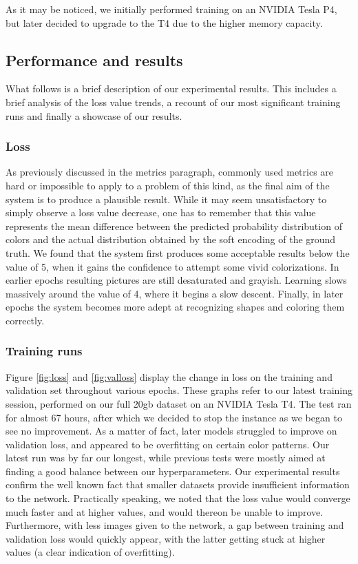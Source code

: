 \documentclass[twoside,twocolumn]{article}
\begin{document}
As it may be noticed, we initially performed training on an NVIDIA Tesla P4, but later decided to upgrade to the T4 due to the higher memory capacity.


\subsection{Performance and results}

What follows is a brief description of our experimental results. This includes a brief analysis of the loss value trends, a recount of our most significant training runs and finally a showcase of our results.

\subsubsection{Loss}

As previously discussed in the metrics paragraph, commonly used metrics are hard or impossible to apply to a problem of this kind, as the final aim of the system is to produce a plausible result. While it may seem unsatisfactory to simply observe a loss value decrease, one has to remember that this value represents the mean difference between the predicted probability distribution of colors and the actual distribution obtained by the soft encoding of the ground truth. 
We found that the system first produces some acceptable results below the value of 5, when it gains the confidence to attempt some vivid colorizations. In earlier epochs resulting pictures are still desaturated and grayish. Learning slows massively around the value of 4, where it begins a slow descent. Finally, in later epochs the system becomes more adept at recognizing shapes and coloring them correctly.

\subsubsection{Training runs}

Figure \ref{fig:loss} and \ref{fig:valloss} display the change in loss on the training and validation set throughout various epochs. These graphs refer to our latest training session, performed on our full 20gb dataset on an NVIDIA Tesla T4. The test ran for almost 67 hours, after which we decided to stop the instance as we began to see no improvement. As a matter of fact, later models struggled to improve on validation loss, and appeared to be overfitting on certain color patterns. 
Our latest run was by far our longest, while previous tests were mostly aimed at finding a good balance between our hyperparameters. Our experimental results confirm the well known fact that smaller datasets provide insufficient information to the network. Practically speaking, we noted that the loss value would converge much faster and at higher values, and would thereon be unable to improve. Furthermore, with less images given to the network, a gap between training and validation loss would quickly appear, with the latter getting stuck at higher values (a clear indication of overfitting).
\end{document}
